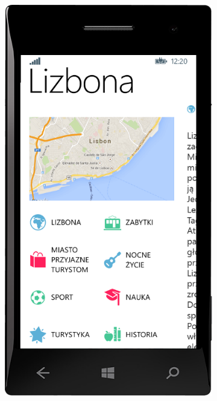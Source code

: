 \documentclass{book}
\begin{document}
				\begin{figure}[H]
					\ContinuedFloat
					
					\begin{subfigure}{0.3\textwidth}
						\includegraphics[width=\textwidth]{screenshots/mobile/mobile7.png}	
						\caption{\label{subfig:mobile_guidedetail}}
					\end{subfigure}

\end{figure}
\end{document}
